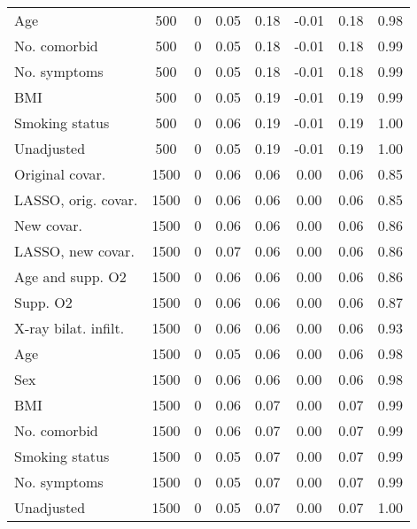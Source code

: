 \documentclass{article}
\begin{document}
\begin{table}[htpb]
{\begin{tabular}{lccccccc}
Age & 500 & 0 & 0.05 & 0.18 & -0.01 & 0.18 & 0.98\\
No. comorbid & 500 & 0 & 0.05 & 0.18 & -0.01 & 0.18 & 0.99\\
No. symptoms & 500 & 0 & 0.05 & 0.18 & -0.01 & 0.18 & 0.99\\
BMI & 500 & 0 & 0.05 & 0.19 & -0.01 & 0.19 & 0.99\\
Smoking status & 500 & 0 & 0.06 & 0.19 & -0.01 & 0.19 & 1.00\\
Unadjusted & 500 & 0 & 0.05 & 0.19 & -0.01 & 0.19 & 1.00\\ \midrule
Original covar. & 1500 & 0 & 0.06 & 0.06 & 0.00 & 0.06 & 0.85\\
LASSO, orig. covar. & 1500 & 0 & 0.06 & 0.06 & 0.00 & 0.06 & 0.85\\
New covar. & 1500 & 0 & 0.06 & 0.06 & 0.00 & 0.06 & 0.86\\
LASSO, new covar. & 1500 & 0 & 0.07 & 0.06 & 0.00 & 0.06 & 0.86\\
Age and supp. O2 & 1500 & 0 & 0.06 & 0.06 & 0.00 & 0.06 & 0.86\\
Supp. O2 & 1500 & 0 & 0.06 & 0.06 & 0.00 & 0.06 & 0.87\\
X-ray bilat. infilt. & 1500 & 0 & 0.06 & 0.06 & 0.00 & 0.06 & 0.93\\
Age & 1500 & 0 & 0.05 & 0.06 & 0.00 & 0.06 & 0.98\\
Sex & 1500 & 0 & 0.06 & 0.06 & 0.00 & 0.06 & 0.98\\
BMI & 1500 & 0 & 0.06 & 0.07 & 0.00 & 0.07 & 0.99\\
No. comorbid & 1500 & 0 & 0.06 & 0.07 & 0.00 & 0.07 & 0.99\\
Smoking status & 1500 & 0 & 0.05 & 0.07 & 0.00 & 0.07 & 0.99\\
No. symptoms & 1500 & 0 & 0.05 & 0.07 & 0.00 & 0.07 & 0.99\\
Unadjusted & 1500 & 0 & 0.05 & 0.07 & 0.00 & 0.07 & 1.00\\
\bottomrule
\hline
\end{tabular}}
\end{table}
\end{document}
